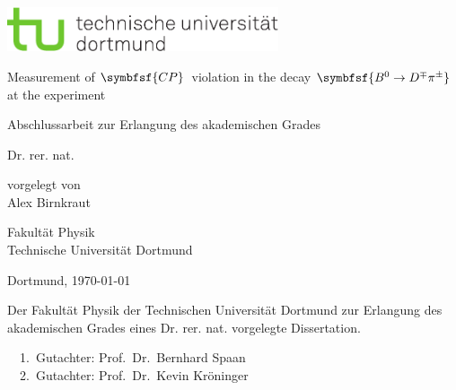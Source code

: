
\begin{titlepage}
\includegraphics[width=8cm]{tud-logo-cmyk.pdf}
\vspace*{15ex}
{%
\Huge \sffamily \bfseries
\begin{center}
Measurement of $\symbfsf{C{}P}$\, violation in the decay $\symbfsf{\Bz\to D^\mp\pi^\pm}$ at the \lhcb experiment
\end{center}
}%

\begin{otherlanguage}{german}
{%
\LARGE \sffamily %
\begin{center}
Abschlussarbeit zur Erlangung des akademischen Grades\\
\end{center}
}

{%
\LARGE \sffamily %
\begin{center}
Dr. rer. nat.
\end{center}
}

\vspace{5ex}


{%
\Large \sffamily
\begin{center}
vorgelegt von \\[0.8ex]
Alex Birnkraut
\end{center}
}
\vspace{5ex}
{%
\Large \sffamily
\begin{center}
Fakultät Physik\\
Technische Universität Dortmund
\end{center}
}
\vspace{4ex}
{%
\Large \sffamily
\begin{center}
Dortmund, \today
\end{center}
}

\clearpage
\thispagestyle{empty}
\vspace*{\fill}
\noindent Der Fakultät Physik der Technischen Universität Dortmund zur Erlangung
des akademischen Grades eines Dr. rer. nat. vorgelegte
Dissertation.\\

\parbox{\textwidth}{
  1.~Gutachter: Prof.~Dr.~Bernhard Spaan \\
  2.~Gutachter: Prof.~Dr.~Kevin Kröninger\\
}
\end{otherlanguage}
\end{titlepage}
\setcounter{page}{1}
